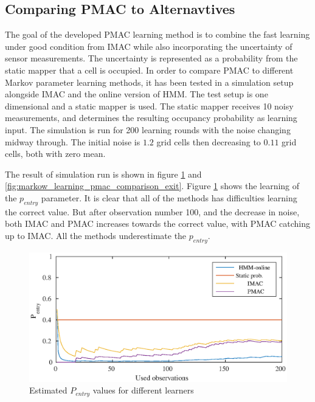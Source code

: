 \subsection{Comparing PMAC to Alternavtives}
The goal of the developed PMAC learning method is to combine the fast learning under good condition from IMAC while also incorporating the uncertainty of sensor measurements. The uncertainty is represented as a probability from the static mapper that a cell is occupied. In order to compare PMAC to different Markov parameter learning methods, it has been tested in a simulation setup alongside IMAC and the online version of HMM. The test setup is one dimensional and a static mapper is used. The static mapper receives 10 noisy measurements, and determines the resulting occupancy probability as learning input. The simulation is run for 200 learning rounds with the noise changing midway through. The initial noise is \(1.2\) grid cells then decreasing to \(0.11\) grid cells, both with zero mean. 

The result of simulation run is shown in figure \ref{fig:markow_learning_pmac_comparison_entry} and \ref{fig:markow_learning_pmac_comparison_exit}. Figure  \ref{fig:markow_learning_pmac_comparison_entry} shows the learning of the \(p_{entry}\) parameter. It is clear that all of the methods has difficulties learning the correct value. But after observation number 100, and the decrease in noise, both IMAC and PMAC increases towards the correct value, with PMAC catching up to IMAC. All the methods underestimate the \(p_{entry}\).

\begin{figure}[H]
	\centering
	\includegraphics[scale=1]{chapters/mapping_of_dynamic_areas/figures/pmac_imac_hmm_entry}
	\caption{Estimated \(P_{entry}\) values for different learners}
	\label{fig:markow_learning_pmac_comparison_entry}
\end{figure}

